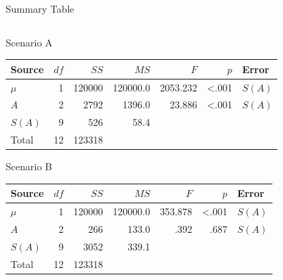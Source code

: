 \documentclass[presentation]{beamer}
\begin{document}
\begin{frame}[label={sec:org4be8ac6}]{Summary Table}
\begin{columns}
\begin{column}{.73\columnwidth}
\begin{block}{Scenario A}
\begin{scriptsize}
\begin{center}
\begin{tabular}{lrrrrrl}
\hline
Source & \(df\) & \(SS\) & \(MS\) & \(F\) & \(p\) & Error\\
\hline
\(\mu\) & 1 & 120000 & 120000.0 & 2053.232 & <.001 & \(S(A)\)\\
\(A\) & 2 & 2792 & 1396.0 & 23.886 & <.001 & \(S(A)\)\\
\(S(A)\) & 9 & 526 & 58.4 &  &  & \\
\hline
Total & 12 & 123318 &  &  &  & \\
\hline
\end{tabular}
\end{center}
\end{scriptsize}
\end{block}

\begin{block}{Scenario B}
\begin{scriptsize}
\begin{center}
\begin{tabular}{lrrrrrl}
\hline
Source & \(df\) & \(SS\) & \(MS\) & \(F\) & \(p\) & Error\\
\hline
\(\mu\) & 1 & 120000 & 120000.0 & 353.878 & <.001 & \(S(A)\)\\
\(A\) & 2 & 266 & 133.0 & .392 & .687 & \(S(A)\)\\
\(S(A)\) & 9 & 3052 & 339.1 &  &  & \\
\hline
Total & 12 & 123318 &  &  &  & \\
\hline
\end{tabular}
\end{center}
\end{scriptsize}
\end{block}
\end{column}
\end{columns}
\end{frame}
\end{document}

